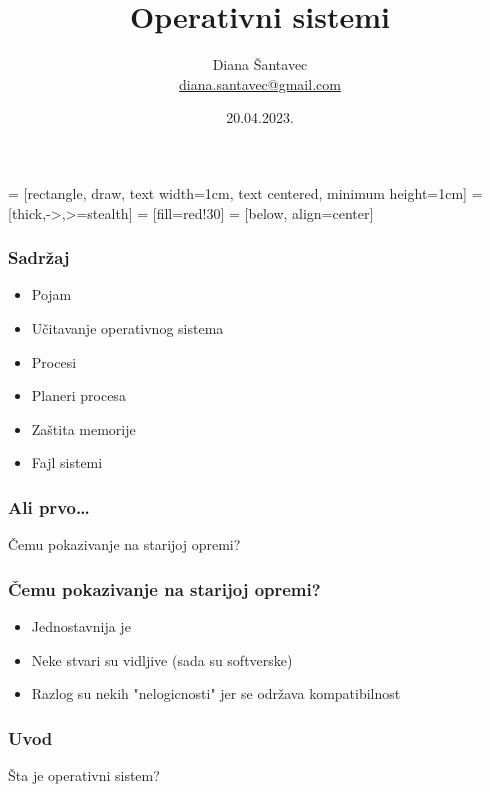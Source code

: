 \documentclass{beamer}
\title{Operativni sistemi}
\author[Diana Šantavec]{Diana Šantavec \\ \small \url{diana.santavec@gmail.com}}
\institute{Istraživačka stanica Petnica}
\date{20.04.2023.}
\begin{document}

 = [rectangle, draw, text width=1cm, text centered, minimum height=1cm]
 = [thick,->,>=stealth]
 = [fill=red!30]
 = [below, align=center]

\frame{\titlepage}


\begin{frame}
\frametitle{Sadržaj}
\begin{itemize}
    \item Pojam \newline
    \item Učitavanje operativnog sistema \newline
    \item Procesi \newline
    \item Planeri procesa \newline
    \item Zaštita memorije \newline
    \item Fajl sistemi
\end{itemize}
\end{frame}

\begin{frame}
    \frametitle{Ali prvo\dots}
    \centering
    \LARGE{Čemu pokazivanje na starijoj opremi?}
\end{frame}

\begin{frame}
    \frametitle{Čemu pokazivanje na starijoj opremi?}
    \begin{itemize}
        \item Jednostavnija je \newline
        \item Neke stvari su vidljive (sada su softverske) \newline
        \item Razlog su nekih "nelogicnosti" jer se održava kompatibilnost
    \end{itemize}
\end{frame}

\begin{frame}
    \frametitle{Uvod}
    \begin{center}
        \LARGE{Šta je operativni sistem?}
    \end{center}
\end{frame}
\end{document}
